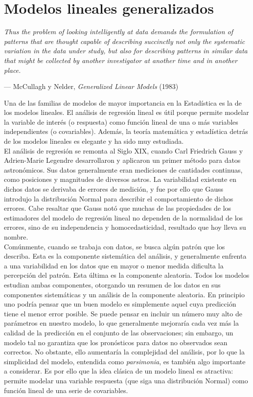 \chapter{Modelos lineales generalizados} \label{chapter:glms}

\epigraph{\textit{Thus the problem of looking intelligently at data demands the formulation of patterns that are thought capable of describing succinctly not only the systematic variation in the data under study, but also for describing patterns in similar data that might be collected by another investigator at another time and in another place.}}{--- McCullagh y Nelder, \textit{Generalized Linear Models} (1983)}

Una de las familias de modelos de mayor importancia en la Estadística es la de los modelos lineales. El análisis de regresión lineal es útil porque permite modelar la variable de interés (o respuesta) como función lineal de una o más variables independientes (o covariables). Además, la teoría matemática y estadística detrás de los modelos lineales es elegante y ha sido muy estudiada. \\


El análisis de regresión se remonta al Siglo XIX, cuando Carl Friedrich Gauss y Adrien-Marie Legendre desarrollaron y aplicaron un primer método para datos astronómicos. Sus datos generalmente eran mediciones de cantidades continuas, como posiciones y magnitudes de diversos astros. La variabilidad existente en dichos datos se derivaba de errores de medición, y fue por ello que Gauss introdujo la distribución Normal para describir el comportamiento de dichos errores.  Cabe resaltar que Gauss notó que muchas de las propiedades de los estimadores del modelo de regresión lineal no dependen de la normalidad de los errores, sino de su independencia y homocedasticidad, resultado que hoy lleva su nombre. \\


Comúnmente, cuando se trabaja con datos, se busca algún patrón que los describa. Esta es la componente sistemática del análisis, y generalmente enfrenta a una variabilidad en los datos que en mayor o menor medida dificulta la percepción del patrón. Esta última es la componente aleatoria. Todos los modelos estudian ambas componentes, otorgando un resumen de los datos en sus componentes sistemáticas y un análisis de la componente aleatoria. En principio uno podría pensar que un buen modelo es simplemente aquel cuya predicción tiene el menor error posible. Se puede pensar en incluir un número muy alto de parámetros en nuestro modelo, lo que generalmente mejoraría cada vez más la calidad de la predicción en el conjunto de las observaciones; sin embargo, un modelo tal no garantiza que los pronósticos para datos no observados sean correctos. No obstante, ello aumentaría la complejidad del análisis, por lo que la simplicidad del modelo, entendida como \textit{parsimonia}, es también algo importante a considerar. Es por ello que la idea clásica de un modelo lineal es atractiva: permite modelar una variable respuesta (que siga una distribución Normal) como función lineal de una serie de covariables. \\


